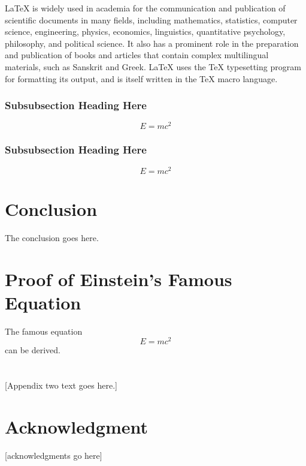 \documentclass[journal]{Imperial_lab_report}
\begin{document}
LaTeX is widely used in academia for the communication and publication of scientific documents in many fields, including mathematics, statistics, computer science, engineering, physics, economics, linguistics, quantitative psychology, philosophy, and political science. It also has a prominent role in the preparation and publication of books and articles that contain complex multilingual materials, such as Sanskrit and Greek. LaTeX uses the TeX typesetting program for formatting its output, and is itself written in the TeX macro language.
\subsubsection{Subsubsection Heading Here}
$$ E = mc^2$$
\subsubsection{Subsubsection Heading Here}
$$ E = mc^2$$

\section{Conclusion}
The conclusion goes here.

\appendices
\section{Proof of  Einstein's Famous  Equation}
The famous equation $$ E = mc^2$$
can be derived.
\section{}
[Appendix two text goes here.]

\section*{Acknowledgment}

[acknowledgments go here]

\ifCLASSOPTIONcaptionsoff
  \newpage
\fi

 

\end{document}
